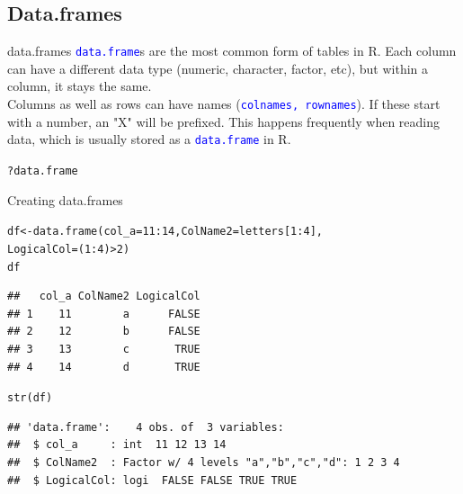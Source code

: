 \documentclass[xcolor=table,       handout,    xcolor=dvipsnames]{beamer}\usepackage[]{graphicx}\usepackage[]{color}
\makeatletter
\newcommand{\hlnum}[1]{\textcolor[rgb]{0,0,0}{#1}}
\newcommand{\hlopt}[1]{\textcolor[rgb]{0,0,0}{#1}}
\newcommand{\hlstd}[1]{\textcolor[rgb]{0,0,0}{#1}}
\newcommand{\hlkwb}[1]{\textcolor[rgb]{0,0,0}{#1}}
\newcommand{\hlkwc}[1]{\textcolor[rgb]{1,0,1}{#1}}
\newcommand{\hlkwd}[1]{\textcolor[rgb]{0,0,1}{#1}}
\newenvironment{kframe}{%
 \def\at@end@of@kframe{}%
 \ifinner\ifhmode%
  \def\at@end@of@kframe{\end{minipage}}%
  \begin{minipage}{\columnwidth}%
 \fi\fi%
 \def\FrameCommand##1{\hskip\@totalleftmargin \hskip-\fboxsep
 \colorbox{shadecolor}{##1}\hskip-\fboxsep
     \hskip-\linewidth \hskip-\@totalleftmargin \hskip\columnwidth}%
 \MakeFramed {\advance\hsize-\width
   \@totalleftmargin\z@ \linewidth\hsize
   \@setminipage}}%
 {\par\unskip\endMakeFramed%
 \at@end@of@kframe}
\newenvironment{knitrout}{}{} %
\newcommand{\rcode}[1]{\texttt{\textcolor{Blue}{#1}}} %
\makeatother
\begin{document}
\subsection{Data.frames}

\begin{frame}[fragile]{data.frames}
\rcode{data.frame}s are the most common form of tables in R.  Each column can have a different data type (numeric, character, factor, etc), but within a column, it stays the same.\\
Columns as well as rows can have names (\rcode{colnames, rownames}). If these start with a number, an "X" will be prefixed.  This happens frequently when reading data, which is usually stored as a \rcode{data.frame} in R.\\
\begin{knitrout}
\color{fgcolor}\begin{kframe}
\begin{alltt}
\hlopt{?}\hlstd{data.frame}
\end{alltt}
\end{kframe}
\end{knitrout}
\end{frame}


\begin{frame}[fragile]{Creating data.frames}
\begin{knitrout}\small
{}\color{fgcolor}\begin{kframe}
\begin{alltt}
\hlstd{df} \hlkwb{<-} \hlkwd{data.frame}\hlstd{(}\hlkwc{col_a}\hlstd{=}\hlnum{11}\hlopt{:}\hlnum{14}\hlstd{,} \hlkwc{ColName2}\hlstd{=letters[}\hlnum{1}\hlopt{:}\hlnum{4}\hlstd{],}
                 \hlkwc{LogicalCol}\hlstd{=(}\hlnum{1}\hlopt{:}\hlnum{4}\hlstd{)}\hlopt{>}\hlnum{2}\hlstd{)}
\hlstd{df}
\end{alltt}
\begin{verbatim}
##   col_a ColName2 LogicalCol
## 1    11        a      FALSE
## 2    12        b      FALSE
## 3    13        c       TRUE
## 4    14        d       TRUE
\end{verbatim}
\begin{alltt}
\hlkwd{str}\hlstd{(df)}
\end{alltt}
\begin{verbatim}
## 'data.frame':	4 obs. of  3 variables:
##  $ col_a     : int  11 12 13 14
##  $ ColName2  : Factor w/ 4 levels "a","b","c","d": 1 2 3 4
##  $ LogicalCol: logi  FALSE FALSE TRUE TRUE
\end{verbatim}
\end{kframe}
\end{knitrout}
\end{frame}
\end{document}
